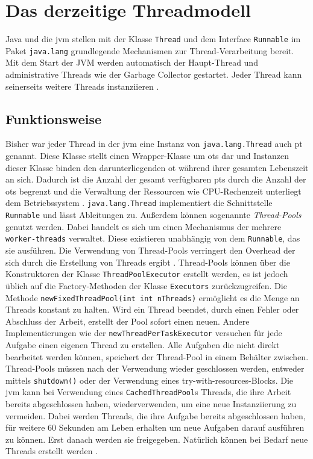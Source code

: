 \chapter{Das derzeitige Threadmodell}
\label{cha:DasDerzeitigeThreadmodell}                   %
    Java und die \gls{jvm} stellen mit der Klasse \texttt{Thread} und dem Interface \texttt{Runnable} im Paket \texttt{java.lang} grundlegende Mechanismen zur Thread-Verarbei\-tung bereit.
    Mit dem Start der JVM werden automatisch der Haupt-Thread und administrative Threads wie der Garbage Collector gestartet. Jeder Thread kann seinerseits weitere Threads instanziieren \cite{GrundKursBS}.
  
\section{Funktionsweise}                                         
\label{sec:Funktionsweise}

    Bisher war jeder Thread in der \gls{jvm} eine Instanz von \texttt{java.lang.Thread} auch \gls{pt} genannt. Diese Klasse stellt einen Wrapper-Klasse um \Glspl{ot} dar und Instanzen dieser Klasse
    binden den darunterliegenden \gls{ot}  während ihrer gesamten Lebenszeit an sich. Dadurch ist die Anzahl der gesamt verfügbaren \Glspl{pt} durch die Anzahl der \Glspl{ot} begrenzt und die Verwaltung
    der Ressourcen wie CPU-Rechenzeit unterliegt dem Betriebssystem \cite{JEP425}.
    \texttt{java.lang.Thread} implementiert die Schnittstelle \texttt{Runnable} und lässt Ableitungen zu.
    Außerdem können sogenannte \emph{Thread-Pools} genutzt werden. Dabei handelt es sich um einen Mechanismus der mehrere \texttt{worker-threads} verwaltet. Diese existieren unabhängig von dem \texttt{Runnable},
    das sie ausführen. Die Verwendung von Thread-Pools verringert den Overhead der sich durch die Erstellung von Threads ergibt \cite{ThreadPool}. Thread-Pools können über die Konstruktoren der Klasse \texttt{ThreadPoolExecutor}
    erstellt werden, es ist jedoch üblich auf die Factory-Methoden der Klasse \texttt{Executors} zurückzugreifen. Die Methode \texttt{newFixedThreadPool(int int nThreads)} ermöglicht es 
    die Menge an Threads konstant zu halten. Wird ein Thread beendet, durch einen Fehler oder Abschluss der Arbeit, erstellt der Pool sofort einen neuen. Andere Implementierungen wie der 
    \texttt{newThread\-PerTaskExecutor} versuchen für jede Aufgabe einen eigenen Thread zu erstellen. Alle Aufgaben die nicht direkt bearbeitet werden können, 
    speichert der Thread-Pool in einem Behälter zwischen. Thread-Pools müssen nach der Verwendung wieder geschlossen werden, entweder mittels \texttt{shutdown()} oder der Verwendung eines
    try-with-resources-Blocks.
    Die \gls{jvm} kann bei Verwendung eines \texttt{CachedThreadPool}s Threads, die ihre Arbeit bereits 
    abgeschlossen haben, wiederverwenden, um eine neue Instanziierung zu vermeiden. Dabei werden Threads, die ihre Aufgabe bereits abgeschlossen haben, für weitere 60 Sekunden am Leben erhalten um 
    neue Aufgaben darauf ausführen zu können. Erst danach werden sie freigegeben. Natürlich können bei Bedarf neue Threads erstellt werden \cite{Executors}.

